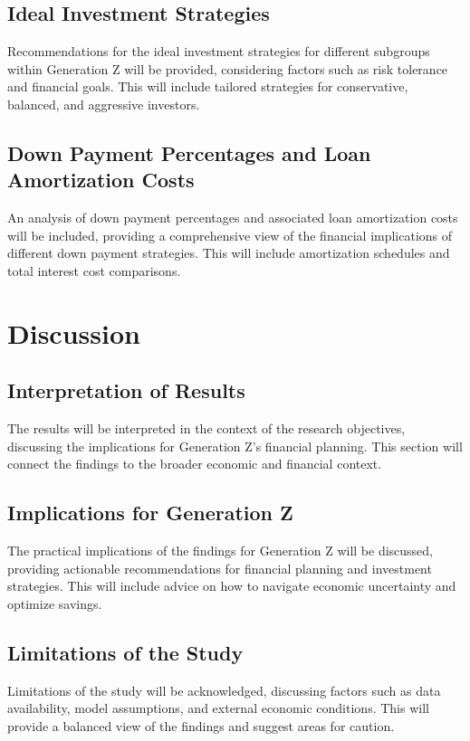 \documentclass[12pt]{report}
\begin{document}
\section{Ideal Investment Strategies}
Recommendations for the ideal investment strategies for different subgroups within Generation Z will be provided, considering factors such as risk tolerance and financial goals. This will include tailored strategies for conservative, balanced, and aggressive investors.

\section{Down Payment Percentages and Loan Amortization Costs}
An analysis of down payment percentages and associated loan amortization costs will be included, providing a comprehensive view of the financial implications of different down payment strategies. This will include amortization schedules and total interest cost comparisons.

\chapter{Discussion}
\section{Interpretation of Results}
The results will be interpreted in the context of the research objectives, discussing the implications for Generation Z’s financial planning. This section will connect the findings to the broader economic and financial context.

\section{Implications for Generation Z}
The practical implications of the findings for Generation Z will be discussed, providing actionable recommendations for financial planning and investment strategies. This will include advice on how to navigate economic uncertainty and optimize savings.

\section{Limitations of the Study}
Limitations of the study will be acknowledged, discussing factors such as data availability, model assumptions, and external economic conditions. This will provide a balanced view of the findings and suggest areas for caution.
\end{document}
